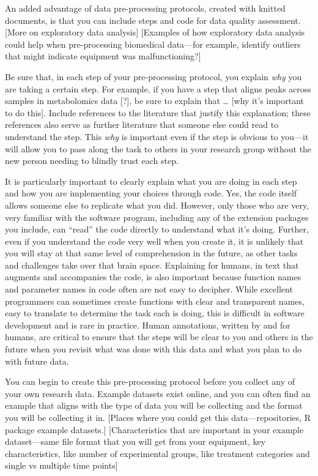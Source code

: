 \documentclass[]{tufte-book}
\begin{document}
An added advantage of data pre-processing protocols, created with knitted
documents, is that you can include steps and code for data quality
assessment. {[}More on exploratory data analysis{]} {[}Examples of how
exploratory data analysis could help when pre-processing biomedical
data---for example, identify outliers that might indicate equipment
was malfunctioning?{]}

Be sure that, in each step of your pre-processing protocol, you explain
\emph{why} you are taking a certain step. For example, if you have a step
that aligns peaks across samples in metabolomics data {[}?{]}, be sure to
explain that \ldots{} {[}why it's important to do this{]}. Include references to
the literature that justify this explanation; these references also
serve as further literature that someone else could read to understand
the step. This \emph{why} is important even if the step is obvious to you---it
will allow you to pass along the task to others in your research group
without the new person needing to blindly trust each step.

It is particularly important to clearly explain what you are doing in
each step and how you are implementing your choices through code. Yes,
the code itself allows someone else to replicate what you did. However,
only those who are very, very familiar with the software program, including
any of the extension packages you include, can ``read'' the code directly
to understand what it's doing. Further, even if you understand the code
very well when you create it, it is unlikely that you will stay at that
same level of comprehension in the future, as other tasks and challenges
take over that brain space. Explaining for humans, in text that augments
and accompanies the code, is also important because function names and
parameter names in code often are not easy to decipher. While excellent
programmers can sometimes create functions with clear and transparent
names, easy to translate to determine the task each is doing, this is
difficult in software development and is rare in practice. Human annotations,
written by and for humans, are critical to ensure that the steps will
be clear to you and others in the future when you revisit what was
done with this data and what you plan to do with future data.

You can begin to create this pre-processing protocol before you collect
any of your own research data. Example datasets exist online, and you
can often find an example that aligns with the type of data you will
be collecting and the format you will be collecting it in. {[}Places where
you could get this data---repositories, R package example datasets.{]}
{[}Characteristics that are important in your example dataset---same file
format that you will get from your equipment, key characteristics, like
number of experimental groups, like treatment categories and single vs
multiple time points{]}
\end{document}
